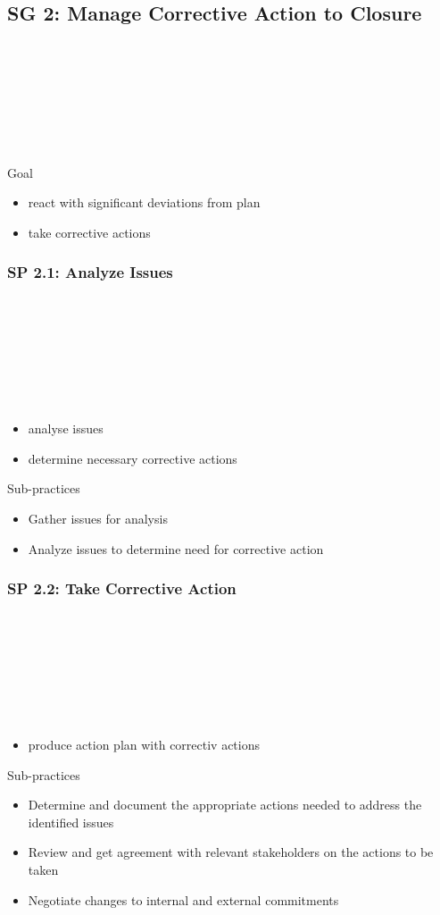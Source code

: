 \documentclass[accentcolor=tud1b]{tudbeamer}
\newcommand{\strong}[1]{\textaccentcolor{\textsf{\textbf{#1}}}}
\newenvironment*{tframe}[1][]{%
	\begin{frame}
	\ifnum\Level=2
		\frametitle{\insertsectionhead\\\strong{#1}}
	\fi\ifnum\Level=3
		\frametitle{\insertsectionhead\\\strong{\insertsubsectionhead} \textnormal{#1}}
	\fi\ifnum\Level=4
		\frametitle{\insertsubsectionhead\\\strong{\insertsubsubsectionhead} #1}
	\fi
}{%
	\end{frame}
}
\newenvironment{listblock}[1]{%
	\begin{block}{#1}
		\begin{itemize}
}{%
		\end{itemize}
	\end{block}
}
\begin{document}
\subsection{SG 2: Manage Corrective Action to Closure}
\begin{tframe}
	\begin{listblock}{Goal}
		\item react with significant deviations from plan
		\item take corrective actions
	\end{listblock}
\end{tframe}

\subsubsection{SP 2.1: Analyze Issues}
\begin{tframe}
	\begin{itemize}
		\item analyse issues
		\item determine necessary corrective actions
	\end{itemize}
	\begin{listblock}{Sub-practices}
		\item Gather issues for analysis
		\item Analyze issues to determine need for corrective action
	\end{listblock}
\end{tframe}

\subsubsection{SP 2.2: Take Corrective Action}
\begin{tframe}
	\begin{itemize}
		\item produce action plan with correctiv actions
	\end{itemize}
	\begin{listblock}{Sub-practices}
		\item Determine and document the appropriate actions needed to address the identified issues
		\item Review and get agreement with relevant stakeholders on the actions to be taken
		\item Negotiate changes to internal and external commitments
	\end{listblock}
\end{tframe}
\end{document}
